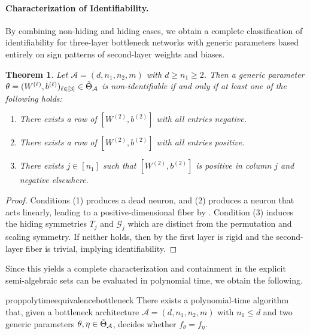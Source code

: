 \documentclass{article}
\newtheorem{theorem}{Theorem}
\theoremstyle{definition}
\newcommand{\architecture}{\mathcal{A}}
\newcommand{\gparamspace}[1]{\Tilde{\Theta}_{#1}}
\newcommand{\weights}[1]{W^{(#1)}}
\newcommand{\bias}[1]{b^{(#1)}}
\begin{document}
\paragraph{Characterization of Identifiability.}

By combining non-hiding and hiding cases, we obtain a complete classification of identifiability  for three-layer bottleneck networks with generic parameters based entirely on sign patterns of second-layer weights and biases. 

\begin{theorem} 
\label{thm:charaterization_identifiablity_bottleneck}
    Let $\architecture=(d,n_1,n_2,m)$ with %
    $d\geq n_1 \geq 2$. 
    Then a generic parameter $\theta=(\weights{\ell},\bias{\ell})_{\ell \in [3]} \in \gparamspace{\architecture}$ is non-identifiable 
    if and only if at least one of the following holds: 
\begin{enumerate}[leftmargin=*]
    \item There exists a row of $[\weights{2},\bias{2}]$ with all entries negative.
    
    \item There exists a row of $[\weights{2},\bias{2}]$ with all entries positive.
    
    \item There exists $j \in [n_1]$ such that 
   $[\weights{2},\bias{2}]$ 
   is 
   positive in column $j$ and negative elsewhere. 
    
\end{enumerate}
\end{theorem}

\begin{proof}
Conditions (1) produces a dead neuron, and (2) produces a neuron that acts linearly, leading to a positive-dimensional fiber by . 
Condition (3) induces the hiding symmetries $T_j$ and $\mathcal{G}_j$ which are distinct from the permutation and scaling symmetry. 
If neither holds, then by  the first layer is rigid and the second-layer fiber is trivial, implying identifiability. 
\end{proof}
Since this yields a complete characterization and containment in the explicit semi-algebraic sets can be evaluated in polynomial time, we obtain the following.

\begin{restatable}{prop}{polytimeequivalencebottleneck}
\label{prop:polytime_equivalence_bottleneck}
There exists a polynomial-time algorithm that, given a bottleneck architecture
$\architecture=(d,n_1,n_2,m)$ with $n_1\le d$ and two generic parameters
$\theta,\eta\in\gparamspace{\architecture}$, decides whether
$
f_\theta=f_\eta.
$
\end{restatable}
\end{document}
